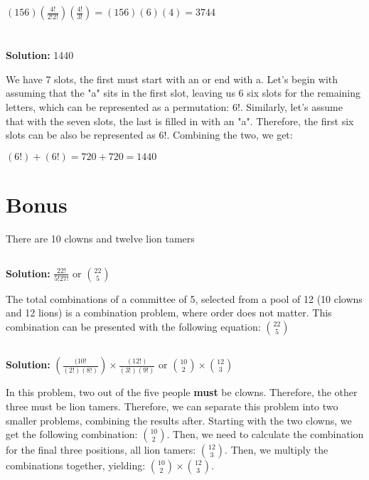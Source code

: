 \documentclass{article}
\begin{document}
$ (156)(\frac{4!}{2!2!})(\frac{4!}{3!}) = (156)(6)(4) = 3744$

\newpage
\section{}
\textbf{Solution: } 1440

We have 7 slots, the first must start with an or end with a. Let's begin with assuming that the "a" sits in the first slot, leaving us 6 six slots for the remaining letters, which can be represented as a permutation: $6!$. Similarly, let's assume that with the seven slots, the last is filled in with an "a". Therefore, the first six slots can be also be represented as $6!$. Combining the two, we get:

$(6!) + (6!) = 720 + 720 = 1440$

\section{Bonus}

There are 10 clowns and twelve lion tamers

\subsection{}

\textbf{Solution: } $\frac{22!}{5!27!}$ or $\binom{22}{5}$

The total combinations of a committee of 5, selected from a pool of 12 (10 clowns and 12 lions) is a combination problem, where order does not matter. This combination can be presented with the following equation: $\binom{22}{5}$


\subsection{}

\textbf{Solution: } $(\frac{(10!}{(2!)(8!)}) \times \frac{(12!)}{(3!)(9!)}$ or $\binom{10}{2} \times \binom{12}{3}$

In this problem, two out of the five people \textbf{must} be clowns. Therefore, the other three must be lion tamers. Therefore, we can separate this problem into two smaller problems, combining the results after. Starting with the two clowns, we get the following combination: $\binom{10}{2}$. Then, we need to calculate the combination for the final three positions, all lion tamers: $\binom{12}{3}$. Then, we multiply the combinations together, yielding: $\binom{10}{2} \times \binom{12}{3}$.
\end{document}
